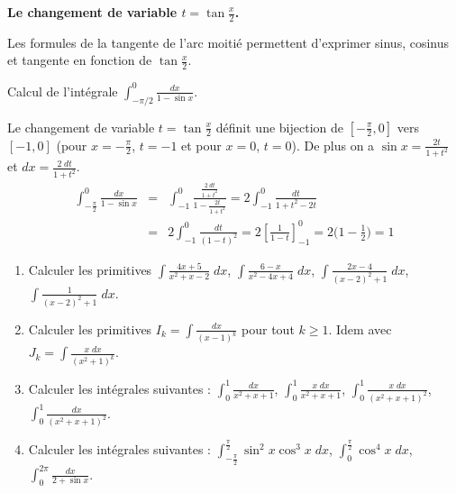 \documentclass[class=report,crop=false]{standalone}
\begin{document}
\bigskip

\textbf{Le changement de variable $t=\tan \frac x2$.}

Les formules de la \og tangente de l'arc moitié \fg{} permettent d'exprimer sinus, cosinus et tangente
en fonction de $\tan \frac x2$.

\begin{exemple}
Calcul de l'intégrale $\int_{-\pi/2}^0 \frac{dx}{1-\sin x}$.

Le changement de variable $t=\tan \frac{x}{2}$ définit une bijection de $[-\frac\pi2,0]$ vers $[-1,0]$
(pour $x=-\frac\pi2$, $t=-1$ et pour $x=0$, $t=0$). De plus on a $\sin x = \frac{2t}{1+t^2}$
et $dx=\frac{2\;dt}{1+t^2}$.
\begin{eqnarray*}
\int_{-\frac\pi2}^0 \frac{dx}{1-\sin x}
&=& \int_{-1}^0 \frac{\frac{2\;dt}{1+t^2}}{1-\frac{2t}{1+t^2}}
= 2\int_{-1}^0 \frac{dt}{1+t^2-2t}\\
&=& 2\int_{-1}^0 \frac{dt}{(1-t)^2}
= 2 \left[\frac{1}{1-t}\right]_{-1}^0
= 2\big(1-\frac12\big)
= 1  
\end{eqnarray*}


\end{exemple}





\begin{miniexercices}
\sauteligne
\begin{enumerate}
  \item Calculer les primitives $\int \frac{4x+5}{x^2+x-2}\; dx$,
$\int \frac{6-x}{x^2-4x+4}\; dx$, $\int \frac{2x-4}{(x-2)^2+1}\; dx$, $\int \frac{1}{(x-2)^2+1}\; dx$.

  \item Calculer les primitives $I_k = \int \frac{dx}{(x-1)^k}$ pour tout $k \ge 1$.
Idem avec $J_k = \int \frac{x\; dx}{(x^2+1)^k}$.

  \item Calculer les intégrales suivantes :
$\int_0^1 \frac{dx}{x^2+x+1}$, $\int_0^1 \frac{x \; dx}{x^2+x+1}$, $\int_0^1\frac{x\; dx}{(x^2+x+1)^2}$,
$\int_0^1\frac{dx}{(x^2+x+1)^2}$.

  \item Calculer les intégrales suivantes :
$\int_{-\frac\pi2}^{\frac\pi2} \sin^2 x \cos^3 x \; dx$,
$\int_{0}^{\frac\pi2} \cos^4 x \; dx$,
$\int_0^{2\pi} \frac{dx}{2+\sin x}$.
\end{enumerate}
\end{miniexercices}



\finchapitre
\end{document}

